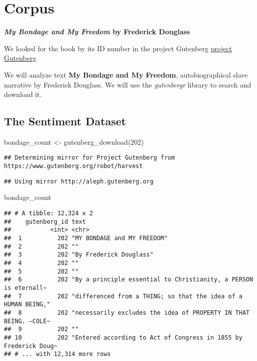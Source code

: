 \documentclass[
]{article}
\newenvironment{Shaded}{\begin{snugshade}}{\end{snugshade}}
\newcommand{\DecValTok}[1]{\textcolor[rgb]{0.00,0.00,0.81}{#1}}
\newcommand{\FunctionTok}[1]{\textcolor[rgb]{0.00,0.00,0.00}{#1}}
\newcommand{\NormalTok}[1]{#1}
\newcommand{\OtherTok}[1]{\textcolor[rgb]{0.56,0.35,0.01}{#1}}
\begin{document}
\hypertarget{corpus}{%
\section{Corpus}\label{corpus}}

\textbf{\emph{My Bondage and My Freedom} by Frederick Douglass}

We looked for the book by its ID number in the project Gutenberg
\href{https://www.gutenberg.org}{project Gutenberg}

We will analyze text \textbf{My Bondage and My Freedom},
autobiographical slave narrative by Frederick Douglass. We will use the
\emph{gutenbergr} library to search and download it.

\hypertarget{the-sentiment-dataset}{%
\subsection{The Sentiment Dataset}\label{the-sentiment-dataset}}

\begin{Shaded}
\begin{Highlighting}[]
\NormalTok{bondage\_count }\OtherTok{\textless{}{-}} \FunctionTok{gutenberg\_download}\NormalTok{(}\DecValTok{202}\NormalTok{)}
\end{Highlighting}
\end{Shaded}

\begin{verbatim}
## Determining mirror for Project Gutenberg from https://www.gutenberg.org/robot/harvest
\end{verbatim}

\begin{verbatim}
## Using mirror http://aleph.gutenberg.org
\end{verbatim}

\begin{Shaded}
\begin{Highlighting}[]
\NormalTok{bondage\_count}
\end{Highlighting}
\end{Shaded}

\begin{verbatim}
## # A tibble: 12,324 x 2
##    gutenberg_id text                                                            
##           <int> <chr>                                                           
##  1          202 "MY BONDAGE and MY FREEDOM"                                     
##  2          202 ""                                                              
##  3          202 "By Frederick Douglass"                                         
##  4          202 ""                                                              
##  5          202 ""                                                              
##  6          202 "By a principle essential to Christianity, a PERSON is eternall~
##  7          202 "differenced from a THING; so that the idea of a HUMAN BEING,"  
##  8          202 "necessarily excludes the idea of PROPERTY IN THAT BEING. —COLE~
##  9          202 ""                                                              
## 10          202 "Entered according to Act of Congress in 1855 by Frederick Doug~
## # ... with 12,314 more rows
\end{verbatim}
\end{document}
